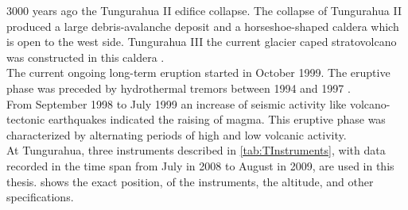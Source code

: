 3000 years ago the Tungurahua II edifice collapse. The collapse of Tungurahua II produced a large debris-avalanche deposit and a horseshoe-shaped caldera which is open to the west side. Tungurahua III the current glacier caped stratovolcano was constructed in this caldera \citep{GlobalVolcanismProgram}.\\
The current ongoing long-term eruption started in October 1999. The eruptive phase was preceded by hydrothermal tremors between 1994 and 1997 \citep{samaniego2003peligros}.\\
From September 1998 to July 1999 an increase of seismic activity like volcano-tectonic earthquakes indicated the raising of magma. This eruptive phase was characterized by alternating periods of high and low volcanic activity. \\

At Tungurahua, three instruments described in \cref{tab:TInstruments}, with data recorded in the time span from July in 2008 to August in 2009, are used in this thesis.
 shows the exact position, of the instruments, the altitude, and other specifications. \\

